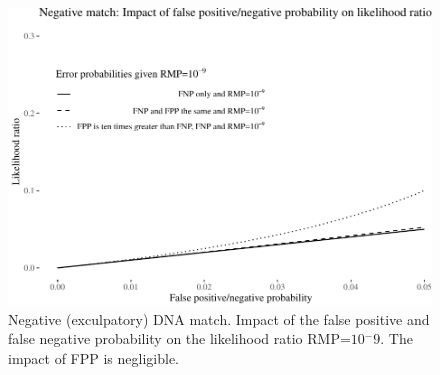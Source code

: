 \documentclass[
  10pt,
  dvipsnames,enabledeprecatedfontcommands]{scrartcl}
\begin{document}
\begin{figure}[t]

\begin{center}\includegraphics[width=1\linewidth]{lr-chapter4_files/figure-latex/fig-fpfnplr-exc-1} \end{center}
\caption{Negative (exculpatory) DNA match. Impact of the false positive and false negative probability on the likelihood ratio RMP=$10{^-9}$. The impact of FPP is negligible.}
\label{fig:fpfnplr-exc}
\end{figure}
\end{document}
